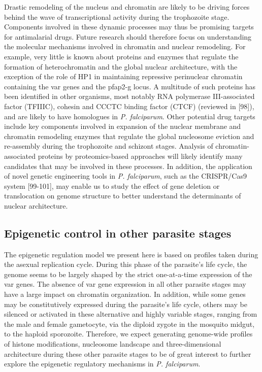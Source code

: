 Drastic remodeling of the nucleus and chromatin are likely to be driving
forces behind the wave of transcriptional activity during the trophozoite
stage. Components involved in these dynamic processes may thus be promising
targets for antimalarial drugs. Future research should therefore focus on
understanding the molecular mechanisms involved in chromatin and nuclear
remodeling. For example, very little is known about proteins and enzymes that
regulate the formation of heterochromatin and the global nuclear architecture,
with the exception of the role of HP1 in maintaining repressive perinuclear
chromatin containing the var genes and the pfap2-g locus. A multitude of such
proteins has been identified in other organisms, most notably RNA polymerase
III-associated factor (TFIIIC), cohesin and CCCTC binding factor (CTCF)
(reviewed in [98]), and are likely to have homologues in \textit{P.
falciparum}. Other
potential drug targets include key components involved in expansion of the
nuclear membrane and chromatin remodeling enzymes that regulate the global
nucleosome eviction and re-assembly during the trophozoite and schizont
stages. Analysis of chromatin-associated proteins by proteomics-based
approaches will likely identify many candidates that may be involved in these
processes. In addition, the application of novel genetic engineering tools in
\textit{P. falciparum}, such as the CRISPR/Cas9 system [99-101], may enable us to study
the effect of gene deletion or translocation on genome structure to better
understand the determinants of nuclear architecture.

\subsection{Epigenetic control in other parasite stages}
The epigenetic regulation model we present here is based on profiles taken
during the asexual replication cycle. During this phase of the parasite’s life
cycle, the genome seems to be largely shaped by the strict one-at-a-time
expression of the var genes. The absence of var gene expression in all other
parasite stages may have a large impact on chromatin organization. In
addition, while some genes may be constitutively expressed during the
parasite’s life cycle, others may be silenced or activated in these
alternative and highly variable stages, ranging from the male and female
gametocyte, via the diploid zygote in the mosquito midgut, to the haploid
sporozoite. Therefore, we expect generating genome-wide profiles of histone
modifications, nucleosome landscape and three-dimensional architecture during
these other parasite stages to be of great interest to further explore the
epigenetic regulatory mechanisms in \textit{P. falciparum}. 

